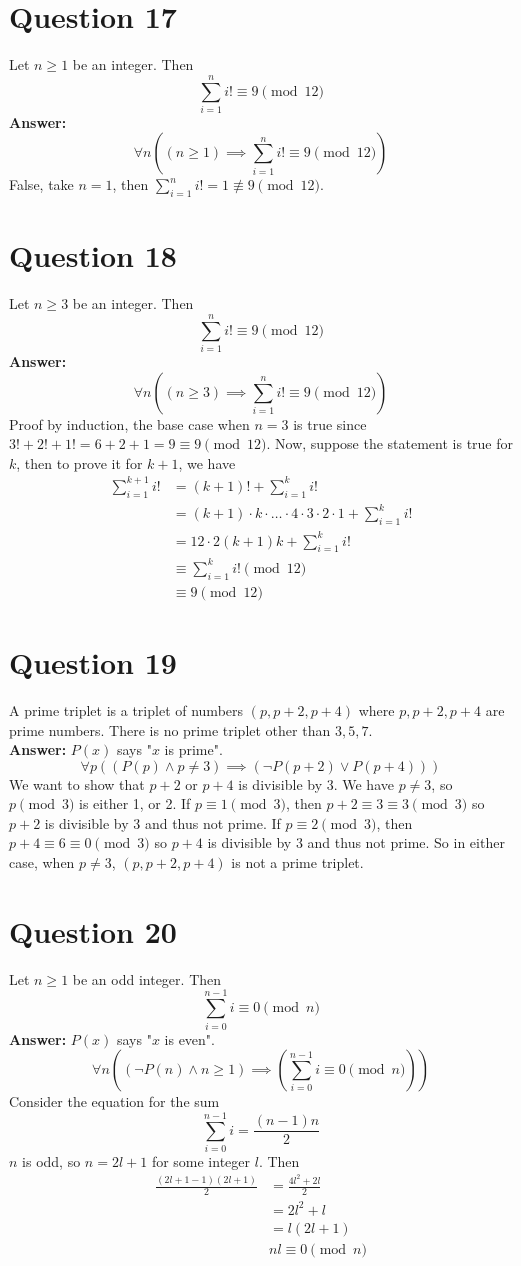 \documentclass[openany]{report}
\begin{document}
\section{Question 17}
Let $n \geq 1$ be an integer. Then 
\[\sum_{i=1}^n i! \equiv 9 \pmod{12}\]
\textbf{Answer:}
\[\forall n ((n \geq 1) \implies \sum_{i=1}^n i! \equiv 9 \pmod{12})\]
False, take $n=1$, then $\sum\limits_{i=1}^n i! = 1 \not\equiv 9 \pmod{12}$. 
\section{Question 18}
Let $n \geq 3$ be an integer. Then
\[\sum_{i=1}^n i! \equiv 9 \pmod{12}\]
\textbf{Answer:}
\[\forall n ((n \geq 3) \implies \sum_{i=1}^n i! \equiv 9 \pmod{12})\]
Proof by induction, the base case when $n=3$ is true since $3! + 2! + 1! = 6 + 2 + 1 = 9 \equiv 9 \pmod{12}$. Now, suppose the statement is true for $k$, then to prove it for $k+1$, we have
\begin{align*}
    \sum_{i=1}^{k+1} i! &= (k+1)! + \sum_{i=1}^k i! \\
    &= (k+1)\cdot k \cdot \ldots \cdot 4 \cdot 3 \cdot 2 \cdot 1 + \sum_{i=1}^k i! \\
    &= 12 \cdot 2(k+1)k + \sum_{i=1}^k i! \\
    &\equiv \sum_{i=1}^k i! \pmod{12}\\
    &\equiv 9 \pmod{12} \tag{By the IH}
\end{align*}
\section{Question 19}
A prime triplet is a triplet of numbers $(p, p +2, p+4)$ where $p,p+2,p+4$ are prime numbers. There is no prime triplet other than $3,5,7$. \\[2ex]
\textbf{Answer:} $P(x)$ says "$x$ is prime".
\[\forall p ((P(p) \wedge p \neq 3) \implies (\neg P(p+2) \vee P(p+4)))\]
We want to show that $p+2$ or $p+4$ is divisible by 3. We have $p \neq 3$, so $p \pmod{3}$ is either 1, or 2. If $p \equiv 1 \pmod{3}$, then $p + 2 \equiv 3 \equiv 3 \pmod{3}$ so $p+2$ is divisible by 3 and thus not prime. If $p \equiv 2 \pmod{3}$, then $p + 4 \equiv 6 \equiv 0 \pmod{3}$ so $p+4$ is divisible by 3 and thus not prime. So in either case, when $p \neq 3$, $(p,p+2,p+4)$ is not a prime triplet.
\section{Question 20}
Let $n\geq 1$ be an odd integer. Then 
\[\sum_{i=0}^{n-1}i \equiv 0 \pmod{n}\]
\textbf{Answer:} $P(x)$ says "$x$ is even".
\[\forall n ((\neg P(n) \wedge n \geq 1) \implies \left(\sum_{i=0}^{n-1} i \equiv 0 \pmod{n}\right))\]
Consider the equation for the sum 
\[\sum_{i=0}^{n-1} i = \frac{(n-1)n}{2}\]
$n$ is odd, so $n = 2l + 1$ for some integer $l$. Then
\begin{align*}
\frac{(2l + 1 - 1)(2l+1)}{2} &= \frac{4l^2 + 2l}{2}\\
& = 2l^2 + l \\
&= l(2l + 1)\\
& nl \equiv 0 \pmod{n}
\end{align*}
\end{document}
